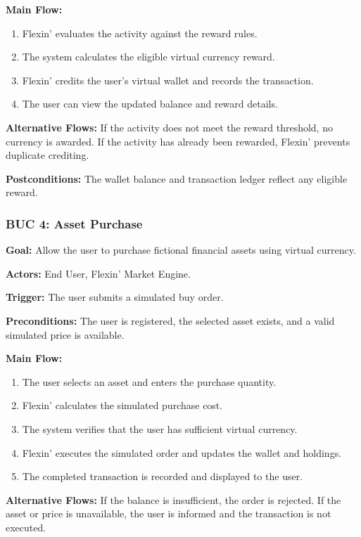 \documentclass[12pt]{article}
\begin{document}
\textbf{Main Flow:}
\begin{enumerate}
    \item Flexin' evaluates the activity against the reward rules.
    \item The system calculates the eligible virtual currency reward.
    \item Flexin' credits the user's virtual wallet and records the transaction.
    \item The user can view the updated balance and reward details.
\end{enumerate}

\textbf{Alternative Flows:} If the activity does not meet the reward
threshold, no currency is awarded. If the activity has already been
rewarded, Flexin' prevents duplicate crediting.

\textbf{Postconditions:} The wallet balance and transaction ledger reflect
any eligible reward.

\subsubsection*{BUC 4: Asset Purchase}

\textbf{Goal:} Allow the user to purchase fictional financial assets using
virtual currency.

\textbf{Actors:} End User, Flexin' Market Engine.

\textbf{Trigger:} The user submits a simulated buy order.

\textbf{Preconditions:} The user is registered, the selected asset exists,
and a valid simulated price is available.

\textbf{Main Flow:}
\begin{enumerate}
    \item The user selects an asset and enters the purchase quantity.
    \item Flexin' calculates the simulated purchase cost.
    \item The system verifies that the user has sufficient virtual currency.
    \item Flexin' executes the simulated order and updates the wallet and holdings.
    \item The completed transaction is recorded and displayed to the user.
\end{enumerate}

\textbf{Alternative Flows:} If the balance is insufficient, the order is
rejected. If the asset or price is unavailable, the user is informed and
the transaction is not executed.
\end{document}
